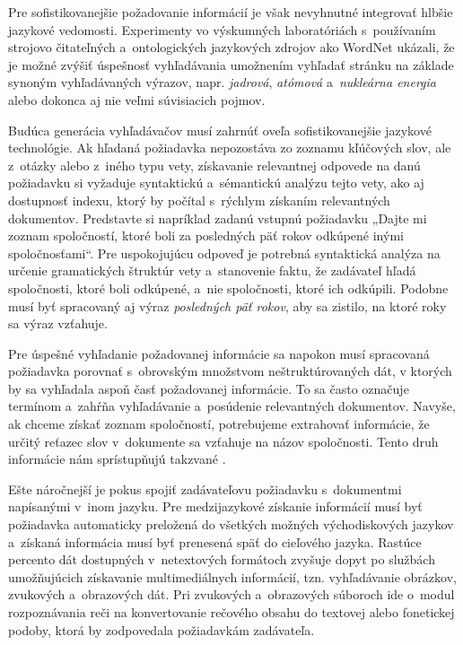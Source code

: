 \begin{multicols}{2}
Pre sofistikovanejšie požadovanie informácií je však nevyhnutné integrovať hlbšie jazykové vedomosti. Experimenty vo výskumných laboratóriách s~používaním strojovo čitateľných  a~ontologických jazykových zdrojov ako WordNet ukázali, že je možné zvýšiť úspešnosť vyhľadávania umožnením vyhľadať stránku na základe synoným vyhľadávaných výrazov, napr. \emph{jadrová}, \emph{atómová} a~\emph{nukleárna energia} alebo dokonca aj nie veľmi súvisiacich pojmov. 

Budúca generácia vyhľadávačov musí zahrnúť oveľa sofistikovanejšie jazykové technológie. Ak hľadaná požiadavka nepozostáva zo zoznamu kľúčových slov, ale z~otázky alebo z~iného typu vety, získavanie relevantnej odpovede na danú požiadavku si vyžaduje syntaktickú a~sémantickú analýzu tejto vety, ako aj dostupnosť indexu, ktorý by počítal s~rýchlym získaním relevantných dokumentov. Predstavte si napríklad zadanú vstupnú požiadavku „Dajte mi zoznam spoločností, ktoré boli za posledných\cite{f23} päť rokov odkúpené inými spoločnosťami“. Pre uspokojujúcu odpoveď je potrebná syntaktická {analýza} na určenie gramatických štruktúr vety a~stanovenie faktu, že zadávateľ hľadá spoločnosti, ktoré boli odkúpené, a~nie spoločnosti, ktoré ich odkúpili. Podobne musí byť spracovaný aj výraz \emph{posledných päť rokov}, aby sa zistilo, na ktoré roky sa výraz vzťahuje. 


Pre úspešné vyhľadanie požadovanej informácie sa napokon musí spracovaná požiadavka porovnať s~obrovským množstvom neštruktúrovaných dát, v ktorých by sa vyhľadala aspoň časť požadovanej informácie. To sa často označuje termínom  a~zahŕňa vyhľadávanie a~posúdenie relevantných dokumentov. Navyše, ak chceme získať zoznam spoločností, potrebujeme extrahovať informácie, že určitý reťazec slov v~dokumente sa vzťahuje na názov spoločnosti. Tento druh informácie nám sprístupňujú takzvané .

Ešte náročnejší je pokus spojiť zadávateľovu požiadavku
s~dokumentmi napísanými v~inom jazyku. Pre medzijazykové
získanie informácií musí byť požiadavka automaticky preložená
do všetkých možných východiskových jazykov a~získaná informácia
musí byť prenesená späť do cieľového jazyka. Rastúce percento
dát dostupných v~netextových formátoch zvyšuje dopyt po službách
umožňujúcich získavanie multimediálnych informácií,
tzn. vyhľadávanie obrázkov, zvukových a~obrazových dát. Pri
zvukových a~obrazových súboroch ide o~modul rozpoznávania
reči na konvertovanie rečového obsahu do textovej alebo fonetickej
podoby, ktorá by zodpovedala požiadavkám zadávateľa.


\end{multicols}
